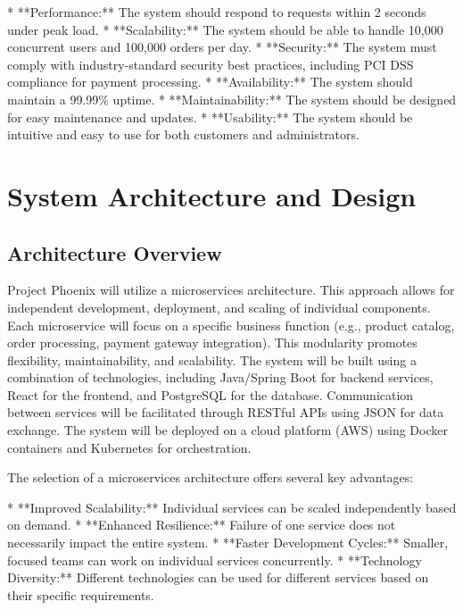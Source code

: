 \documentclass[11pt,a4paper,oneside]{article}
\begin{document}
* **Performance:** The system should respond to requests within 2 seconds under peak load.
* **Scalability:** The system should be able to handle 10,000 concurrent users and 100,000 orders per day.
* **Security:**  The system must comply with industry-standard security best practices, including PCI DSS compliance for payment processing.
* **Availability:**  The system should maintain a 99.99\% uptime.
* **Maintainability:** The system should be designed for easy maintenance and updates.
* **Usability:** The system should be intuitive and easy to use for both customers and administrators.

\section{System Architecture and Design}

\subsection{Architecture Overview}

Project Phoenix will utilize a microservices architecture.  This approach allows for independent development, deployment, and scaling of individual components.  Each microservice will focus on a specific business function (e.g., product catalog, order processing, payment gateway integration).  This modularity promotes flexibility, maintainability, and scalability.  The system will be built using a combination of technologies, including Java/Spring Boot for backend services, React for the frontend, and PostgreSQL for the database.  Communication between services will be facilitated through RESTful APIs using JSON for data exchange.  The system will be deployed on a cloud platform (AWS) using Docker containers and Kubernetes for orchestration.

The selection of a microservices architecture offers several key advantages:

* **Improved Scalability:** Individual services can be scaled independently based on demand.
* **Enhanced Resilience:** Failure of one service does not necessarily impact the entire system.
* **Faster Development Cycles:** Smaller, focused teams can work on individual services concurrently.
* **Technology Diversity:**  Different technologies can be used for different services based on their specific requirements.
\end{document}
